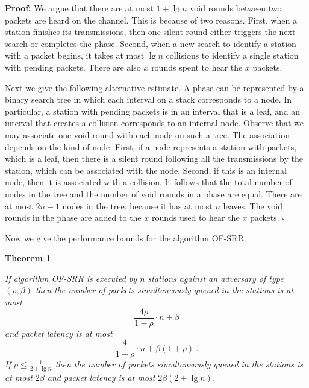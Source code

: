 \documentclass[11pt]{article}
\newcommand{\qed}{\hfill $\square$}
\newtheorem{theorem}{Theorem}
\newenvironment{proof}{\noindent\textbf{Proof: }}{\qed \smallbreak}
\begin{document}
\begin{proof}
We argue that there are at most $1+\lg n$ void rounds between two packets are heard on the channel.  
This is because of two reasons.
First, when a station finishes its transmissions, then one silent round either triggers the next search or completes the phase.
Second, when a new search to identify a station with a packet begins, it takes at most $\lg n$ collisions to identify a single station with pending packets.
There are also $x$ rounds spent to hear the $x$ packets. 

Next we give the following alternative estimate.
A phase can be represented by a binary search tree in which each interval on a stack corresponds to  a node.
In particular, a station with pending packets is in an interval that is a leaf, and an interval that creates a collision corresponds to an internal node. 
Observe that we may associate one void round with each node on such a tree.
The association depends on the kind of node.
First, if a node represents a station with packets, which is a leaf, then there is a silent round following all the transmissions by the station, which can be associated with the node.
Second, if this is an internal node, then it is associated with a collision.
It follows that the total number of nodes in the tree and the number of void rounds in a phase are equal. 
There are at most $2n-1$ nodes in the tree, because it has at most $n$ leaves.
The void rounds in the phase are added to the $x$ rounds used to hear the $x$ packets.
\end{proof}

Now we give the performance bounds for the algorithm \textsc{OF-SRR}.


\begin{theorem}
\label{thm:OF-SRR}

If algorithm \textsc{OF-SRR}  is executed by $n$ stations against an adversary of type $(\rho,\beta)$ then the number of packets simultaneously queued in the stations is at most
\begin{equation}
\label{eqn:OF-SRR-queues}
\frac{4\rho }{1-\rho}\cdot n  +\beta
\end{equation}
and packet latency is at most
\begin{equation}
\label{eqn:OF-SRR-latency}
\frac{4}{1-\rho}\cdot n +\beta(1+\rho)
\ .
\end{equation}
If $\rho\le\frac{1}{2+\lg n}$ then the number of packets simultaneously queued in the stations is at most $2\beta$ and packet latency is at most $2\beta(2+\lg n)$.
\end{theorem}
\end{document}
